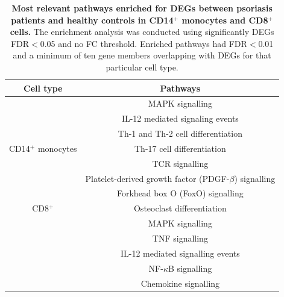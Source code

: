 \begin{table}[htbp]
\centering
\begin{tabular}{@{} c c}
\toprule
\textbf{Cell type} & \textbf{Pathways} \\
\midrule
\midrule
                      & MAPK signalling \\
                      & IL-12 mediated signaling events \\
				              & Th-1 and Th-2 cell differentiation \\
CD14$^+$ monocytes    & Th-17 cell differentiation \\
				              & TCR signalling \\
				              & Platelet-derived growth factor (PDGF-$\beta$) signalling\\
				              & Forkhead box O (FoxO) signalling \\
\midrule				
CD8$^+$  & Osteoclast differentiation \\
         & MAPK signalling \\
				 & TNF signalling \\
         & IL-12 mediated signalling events \\
				 & NF-$\kappa$B signalling \\
				 & Chemokine signalling \\
\bottomrule
\end{tabular}
\medskip %
\caption[Most relevant pathways enriched for DEGs between psoriasis patients and healthy controls in CD14$^+$ monocytes and CD8$^+$ cells.]{\textbf{Most relevant pathways enriched for DEGs between psoriasis patients and healthy controls in CD14$^+$ monocytes and CD8$^+$ cells.} The enrichment analysis was conducted using significantly DEGs FDR$<$0.05 and no FC threshold. Enriched pathways had FDR$<$0.01 and a minimum of ten gene members overlapping with DEGs for that particular cell type.}
\label{tab:RNAseq_PS_CTL_pathway_enrichment}
\end{table}

